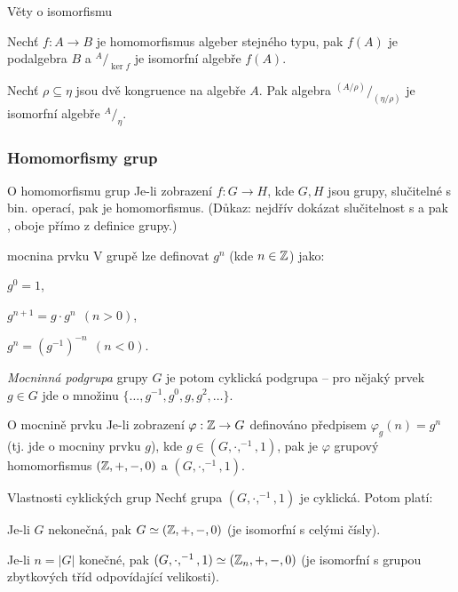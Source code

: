 \begin{vetaN}{Věty o isomorfismu}
\begin{penumerate}
    \item Nechť $f:A\to B$ je homomorfismus algeber stejného typu, pak $f(A)$ je podalgebra $B$ a $^{A}/_{\ker f}$ je isomorfní algebře $f(A)$.
    \item Nechť $\rho\subseteq\eta$ jsou dvě kongruence na algebře $A$. Pak algebra $^{(A/\rho)}/_{(\eta/\rho)}$ je isomorfní algebře $^A/_{\eta}$.
\end{penumerate}
\end{vetaN}

\subsubsection*{Homomorfismy grup}

\begin{vetaN}{O homomorfismu grup}
Je-li zobrazení $f:G\to H$, kde $G,H$ jsou grupy, slučitelné s bin. operací, pak je homomorfismus. (Důkaz: nejdřív dokázat slučitelnost s  a pak , oboje přímo z definice grupy.)
\end{vetaN}

\begin{definiceN}{mocnina prvku}
V grupě lze definovat \emph{$g^n$} (kde $n\in\mathbb{Z}$) jako: 
\begin{pitemize}
    \item $g^0=1$, 
    \item $g^{n+1}=g\cdot g^n\ \ (n>0)$, 
    \item $g^{n}=(g^{-1})^{-n}\ \ (n<0)$.
\end{pitemize}

\emph{Mocninná podgrupa} grupy $G$ je potom cyklická podgrupa -- pro nějaký prvek $g\in G$ jde o množinu $\{\dots,g^{-1},g^0,g,g^2,\dots\}$.
\end{definiceN}

\begin{poznamkaN}{O mocnině prvku}
Je-li zobrazení $\varphi:\mathbb{Z}\to G$ definováno předpisem  $\varphi_g (n) = g^{n}$ (tj. jde o mocniny prvku $g$), kde $g\in (G,\cdot,^{-1},1)$, pak je $\varphi$ grupový homomorfismus $(\mathbb{Z},+,-,0)$ a $(G,\cdot,^{-1},1)$.
\end{poznamkaN}

\begin{poznamkaN}{Vlastnosti cyklických grup}
Nechť grupa $(G,\cdot,^{-1},1)$ je cyklická. Potom platí:
\begin{penumerate}
    \item Je-li $G$ nekonečná, pak $G\simeq(\mathbb{Z},+,-,0)$ (je isomorfní s celými čísly).
    \item Je-li $n = |G|$ konečné, pak $(G,\cdot,^{-1},1)\simeq(\mathbb{Z}_n,+,-,0)$ (je isomorfní s grupou zbytkových tříd odpovídající velikosti).
\end{penumerate}
\end{poznamkaN}

